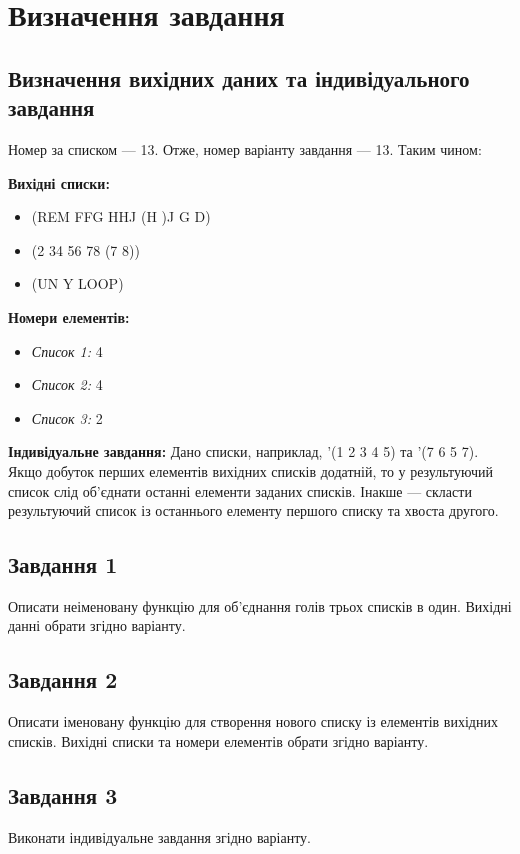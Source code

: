 \documentclass[a4paper, 12pt]{extarticle}
\begin{document}
\section{Визначення завдання}
\subsection{Визначення вихідних даних та індивідуального завдання}
Номер за списком --- 13. Отже, номер варіанту завдання --- 13.
Таким чином:

\textbf{Вихідні списки:}
\begin{itemize}
  \item (REM FFG HHJ (H )J G D)
  \item (2 34 56 78 (7 8))
  \item (UN Y LOOP)
\end{itemize}

\textbf{Номери елементів:}
\begin{itemize}
  \item \textit{Список 1:} 4
  \item \textit{Список 2:} 4
  \item \textit{Список 3:} 2
\end{itemize}

\textbf{Індивідуальне завдання:}
Дано списки, наприклад, '(1 2 3 4 5) та '(7 6 5 7). Якщо добуток перших елементів вихідних списків додатній, то у результуючий список слід об'єднати останні елементи заданих списків. Інакше --- скласти результуючий список із останнього елементу першого списку та хвоста другого.

\subsection{Завдання 1}
Описати неіменовану функцію для об'єднання голів трьох списків в один. Вихідні данні обрати згідно варіанту.

\subsection{Завдання 2}
Описати іменовану функцію для створення нового списку із елементів вихідних списків. Вихідні списки та номери елементів обрати згідно варіанту.

\subsection{Завдання 3}
Виконати індивідуальне завдання згідно варіанту.
\end{document}

